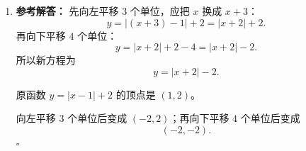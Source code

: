 \documentclass[11pt,a4paper,fontset=fandol]{ctexart}
\newenvironment{solution}{\par\noindent\textbf{参考解答：}}{\hfill$\square$\par}
\begin{document}
\begin{enumerate}
\begin{solution}
  现在顶点变成 $(2,-1)$，说明图像向右平移了 $2$ 个单位，再向下平移了 $1$ 个单位。

  因此新方程为
  \[
  \boxed{y=(x-2)^2-1}.
  \]
  \end{solution}

  \item \begin{solution}
  先向左平移 $3$ 个单位，应把 $x$ 换成 $x+3$：
  \[
  y=|(x+3)-1|+2=|x+2|+2.
  \]
  再向下平移 $4$ 个单位：
  \[
  y=|x+2|+2-4=|x+2|-2.
  \]
  所以新方程为
  \[
  \boxed{y=|x+2|-2}.
  \]

  原函数 $y=|x-1|+2$ 的顶点是 $(1,2)$。

  向左平移 $3$ 个单位后变成 $(-2,2)$；再向下平移 $4$ 个单位后变成
  \[
  \boxed{(-2,-2)}.
  \]
  \end{solution}
\end{enumerate}
\end{document}
